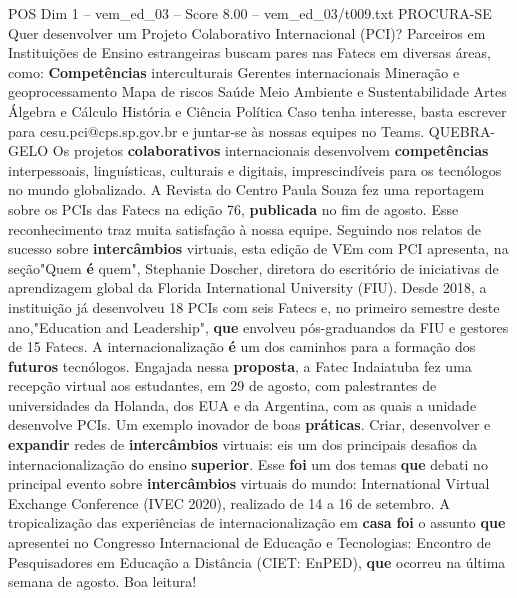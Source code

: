 \begin{textsample}{POS Dim 1 – vem\_ed\_03 – Score 8.00 – vem\_ed\_03/t009.txt}  \label{ex:f1_pos_158}
PROCURA-SE Quer desenvolver um Projeto Colaborativo Internacional (PCI)?
Parceiros em Instituições de Ensino estrangeiras buscam pares nas Fatecs em diversas áreas, como: \textbf{Competências} interculturais Gerentes internacionais Mineração e geoprocessamento Mapa de riscos Saúde Meio Ambiente e Sustentabilidade Artes Álgebra e Cálculo História e Ciência Política Caso tenha interesse, basta escrever para cesu.pci@cps.sp.gov.br e juntar-se às nossas equipes no Teams.
QUEBRA-GELO Os projetos \textbf{colaborativos} internacionais desenvolvem \textbf{competências} interpessoais, linguísticas, culturais e digitais, imprescindíveis para os tecnólogos no mundo globalizado.
A Revista do Centro Paula Souza fez uma reportagem sobre os PCIs das Fatecs na edição 76, \textbf{publicada} no fim de agosto.
Esse reconhecimento traz muita satisfação à nossa equipe.
Seguindo nos relatos de sucesso sobre \textbf{intercâmbios} virtuais, esta edição de VEm com PCI apresenta, na seção"Quem \textbf{é} quem", Stephanie Doscher, diretora do escritório de iniciativas de aprendizagem global da Florida International University (FIU).
Desde 2018, a instituição já desenvolveu 18 PCIs com seis Fatecs e, no primeiro semestre deste ano,"Education and Leadership", \textbf{que} envolveu pós-graduandos da FIU e gestores de 15 Fatecs.
A internacionalização \textbf{é} um dos caminhos para a formação dos \textbf{futuros} tecnólogos.
Engajada nessa \textbf{proposta}, a Fatec Indaiatuba fez uma recepção virtual aos estudantes, em 29 de agosto, com palestrantes de universidades da Holanda, dos EUA e da Argentina, com as quais a unidade desenvolve PCIs.
Um exemplo inovador de boas \textbf{práticas}.
Criar, desenvolver e \textbf{expandir} redes de \textbf{intercâmbios} virtuais: eis um dos principais desafios da internacionalização do ensino \textbf{superior}.
Esse \textbf{foi} um dos temas \textbf{que} debati no principal evento sobre \textbf{intercâmbios} virtuais do mundo: International Virtual Exchange Conference (IVEC 2020), realizado de 14 a 16 de setembro.
A tropicalização das experiências de internacionalização em \textbf{casa} \textbf{foi} o assunto \textbf{que} apresentei no Congresso Internacional de Educação e Tecnologias: Encontro de Pesquisadores em Educação a Distância (CIET: EnPED), \textbf{que} ocorreu na última semana de agosto.
Boa leitura!

\end{textsample}
